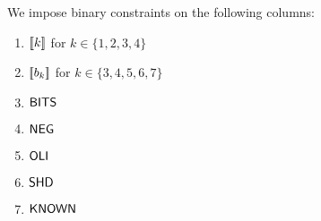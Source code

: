 We impose binary constraints on the following columns:
\begin{multicols}{3}
\begin{enumerate}
	\item $[\![k]\!]$ for $k \in \{1, 2, 3, 4\}$
	\item $[\![b_{k}]\!]$ for $k \in \{3, 4, 5, 6, 7\}$
	\item $\textsf{BITS}$
	\item $\textsf{NEG}$
	\item $\textsf{OLI}$
	\item $\textsf{SHD}$
	\item $\textsf{KNOWN}$
\end{enumerate}
\end{multicols}